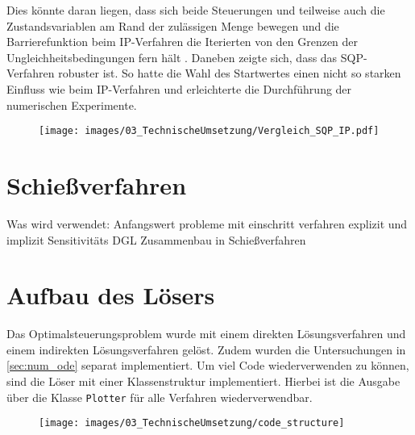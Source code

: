 Dies könnte daran liegen, dass sich beide Steuerungen und teilweise auch die Zustandsvariablen am Rand der zulässigen Menge bewegen und die Barrierefunktion beim IP-Verfahren die Iterierten von den Grenzen der Ungleichheitsbedingungen fern hält \cite{Matlab2016}. Daneben zeigte sich, dass das SQP-Verfahren robuster ist. So hatte die Wahl des Startwertes einen nicht so starken Einfluss wie beim IP-Verfahren und erleichterte die Durchführung der numerischen Experimente. 

\begin{figure}[H]
    \begin{center}
        \texttt{[image: images/03\_TechnischeUmsetzung/Vergleich\_SQP\_IP.pdf]}
         \label{img:Vergleich_SQP_IP}
    \end{center}
\end{figure}

\section{Schießverfahren}

Was wird verwendet:
Anfangswert probleme mit einschritt verfahren explizit und implizit
Sensitivitäts DGL
Zusammenbau in Schießverfahren


\section{Aufbau des Lösers}
Das Optimalsteuerungsproblem wurde mit einem direkten Lösungsverfahren und einem indirekten Lösungsverfahren gelöst. Zudem wurden die Untersuchungen in \autoref{sec:num_ode} separat implementiert. Um viel Code wiederverwenden zu können, sind die Löser mit einer Klassenstruktur implementiert. Hierbei ist die Ausgabe über die Klasse \verb+Plotter+ für alle Verfahren wiederverwendbar.

\begin{figure}[H]
    \centering
    \texttt{[image: images/03\_TechnischeUmsetzung/code\_structure]}
    \label{fig:code_structure}
\end{figure}


